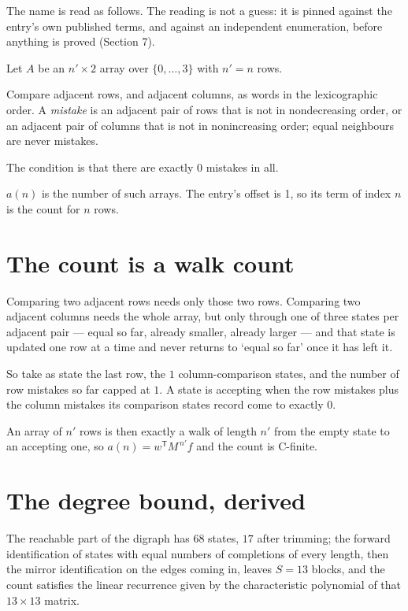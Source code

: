 \documentclass[11pt]{article}
\theoremstyle{definition}
\begin{document}
The name is read as follows. The reading is not a guess: it is pinned against the entry's own published terms, and against an independent enumeration, before anything is proved (Section 7).

Let $A$ be an $n' \times 2$ array over $\{0,\dots,3\}$ with $n' = n$ rows.

Compare adjacent rows, and adjacent columns, as words in the lexicographic order. A {\itshape mistake} is an adjacent pair of rows that is not in nondecreasing order, or an adjacent pair of columns that is not in nonincreasing order; equal neighbours are never mistakes.

The condition is that there are exactly $0$ mistakes in all.

$a(n)$ is the number of such arrays. The entry's offset is 1, so its term of index $n$ is the count for $n$ rows.

\section{The count is a walk count}

Comparing two adjacent rows needs only those two rows. Comparing two adjacent columns needs the whole array, but only through one of three states per adjacent pair --- equal so far, already smaller, already larger --- and that state is updated one row at a time and never returns to `equal so far' once it has left it.

So take as state the last row, the $1$ column-comparison states, and the number of row mistakes so far capped at $1$. A state is accepting when the row mistakes plus the column mistakes its comparison states record come to exactly $0$.

An array of $n'$ rows is then exactly a walk of length $n'$ from the empty state to an accepting one, so $a(n) = w^{\mathsf T}M^{\,n'}f$ and the count is C-finite.

\section{The degree bound, derived}

The reachable part of the digraph has $68$ states, $17$ after trimming; the forward identification of states with equal numbers of completions of every length, then the mirror identification on the edges coming in, leaves $S = 13$ blocks, and the count satisfies the linear recurrence given by the characteristic polynomial of that $13\times13$ matrix.
\end{document}
